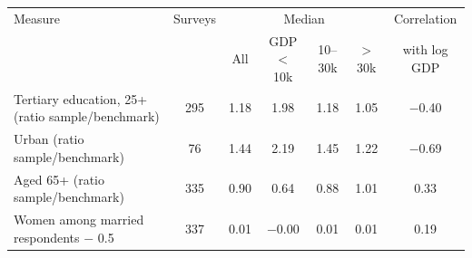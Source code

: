 \begin{tabular}{lcccccc}
\toprule
Measure & Surveys & \multicolumn{4}{c}{Median} & Correlation \\ & & All & GDP $<$ 10k & 10--30k & $>$ 30k & with log GDP \\
\midrule
Tertiary education, 25+ (ratio sample/benchmark) & 295 & 1.18 & 1.98 & 1.18 & 1.05 & \ensuremath{-}0.40 \\
Urban (ratio sample/benchmark) & 76 & 1.44 & 2.19 & 1.45 & 1.22 & \ensuremath{-}0.69 \\
Aged 65+ (ratio sample/benchmark) & 335 & 0.90 & 0.64 & 0.88 & 1.01 & 0.33 \\
Women among married respondents $-$ 0.5 & 337 & 0.01 & \ensuremath{-}0.00 & 0.01 & 0.01 & 0.19 \\
\bottomrule
\end{tabular}
